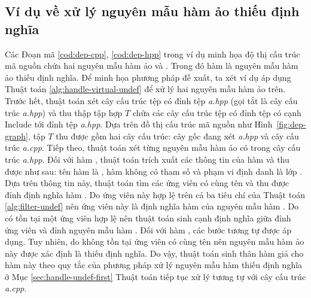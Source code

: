 \subsection*{Ví dụ về xử lý nguyên mẫu hàm ảo thiếu định nghĩa}
Các Đoạn mã \autoref{cod:dep-cpp}, \autoref{cod:dep-hpp} trong ví dụ minh họa độ thị cấu trúc mã nguồn chứa hai nguyên mẫu hàm ảo  và . Trong đó hàm  là nguyên mẫu hàm ảo thiếu định nghĩa. Để minh họa phương pháp đề xuất, ta xét ví dụ áp dụng Thuật toán \autoref{alg:handle-virtual-undef} để xử lý hai nguyên mẫu hàm ảo trên. Trước hết, thuật toán xét cây cấu trúc tệp có đỉnh tệp \textit{a.hpp} (gọi tắt là cây cấu trúc \textit{a.hpp}) và thu thập tập hợp $T$ chứa các cây cấu trúc tệp có đỉnh tệp có cạnh Include tới đỉnh tệp \textit{a.hpp}. Dựa trên đồ thị cấu trúc mã nguồn như Hình~\autoref{fig:dep-graph}, tập $T$ thu được gồm hai cây cấu trúc: cây gốc đang xét \textit{a.hpp} và cây cấu trúc \textit{a.cpp}. Tiếp theo, thuật toán xét từng nguyên mẫu hàm ảo có trong cây cấu trúc \textit{a.hpp}. Đối với hàm , thuật toán trích xuất các thông tin của hàm và thu được như sau: tên hàm là , hàm không có tham số và phạm vi định danh là lớp . Dựa trên thông tin này, thuật toán tìm các ứng viên có cùng tên  và thu được đỉnh định nghĩa hàm . Do ứng viên này hợp lệ trên cả ba tiêu chí của Thuật toán \autoref{alg:filter-undef} nên ứng viên này là định nghĩa hàm của nguyên mẫu hàm . Do có tồn tại một ứng viên hợp lệ nên thuật toán sinh cạnh định nghĩa giữa đỉnh ứng viên và đỉnh nguyên mẫu hàm . Đối với hàm , các bước tương tự được áp dụng. Tuy nhiên, do không tồn tại ứng viên có cùng tên  nên nguyên mẫu hàm ảo này được xác định là thiếu định nghĩa. Do vậy, thuật toán sinh thân hàm giả cho hàm này theo quy tắc của phương pháp xử lý nguyên mẫu hàm thiếu định nghĩa ở Mục \autoref{sec:handle-undef-first} Thuật toán tiếp tục xử lý tương tự với cây cấu trúc \textit{a.cpp}. 

%    

